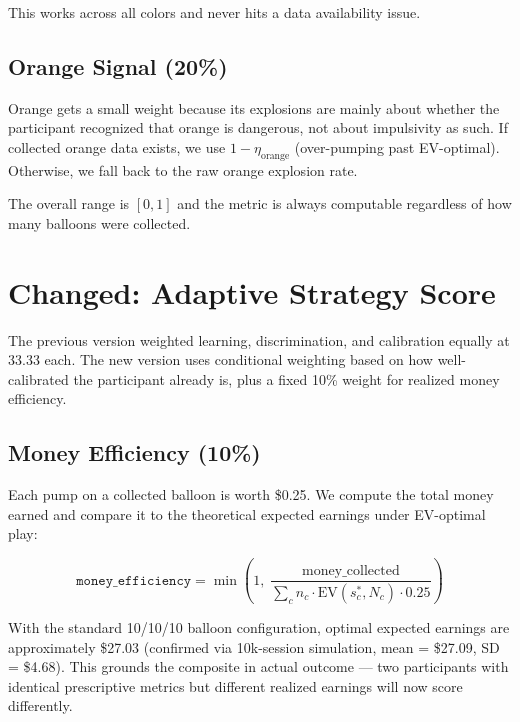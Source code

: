 \documentclass[11pt,a4paper]{article}
\begin{document}
This works across all colors and never hits a data availability issue.

\subsection{Orange Signal (20\%)}

Orange gets a small weight because its explosions are mainly about
whether the participant recognized that orange is dangerous, not about
impulsivity as such. If collected orange data exists, we use
$1 - \eta_{\text{orange}}$ (over-pumping past EV-optimal). Otherwise, we
fall back to the raw orange explosion rate.

The overall range is $[0, 1]$ and the metric is always computable
regardless of how many balloons were collected.


\section{Changed: Adaptive Strategy Score}

The previous version weighted learning, discrimination, and calibration
equally at 33.33 each. The new version uses conditional weighting based on
how well-calibrated the participant already is, plus a fixed 10\% weight
for realized money efficiency.

\subsection{Money Efficiency (10\%)}

Each pump on a collected balloon is worth \$0.25. We compute the total
money earned and compare it to the theoretical expected earnings under
EV-optimal play:

\begin{equation}
    \texttt{money\_efficiency} = \min\!\left(1,\;
        \frac{\text{money\_collected}}{\sum_c n_c \cdot \text{EV}(s^*_c, N_c) \cdot 0.25}
    \right)
\end{equation}

With the standard 10/10/10 balloon configuration, optimal expected earnings
are approximately \$27.03 (confirmed via 10k-session simulation,
mean = \$27.09, SD = \$4.68). This grounds the composite in actual outcome
--- two participants with identical prescriptive metrics but different
realized earnings will now score differently.
\end{document}
